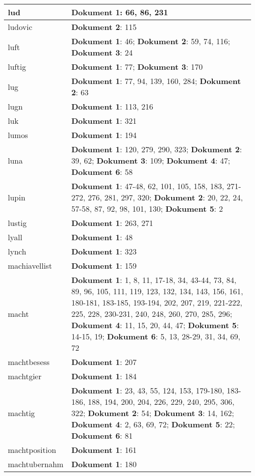 \documentclass[a5paper]{article}
\begin{document}
\begin{longtable}[l]{|l|p{3in}|}
\hline
lud & \textbf{Dokument 1}: 66, 86, 231 \\
\hline
ludovic & \textbf{Dokument 2}: 115 \\
\hline
luft & \textbf{Dokument 1}: 46; \textbf{Dokument 2}: 59, 74, 116; \textbf{Dokument 3}: 24 \\
\hline
luftig & \textbf{Dokument 1}: 77; \textbf{Dokument 3}: 170 \\
\hline
lug & \textbf{Dokument 1}: 77, 94, 139, 160, 284; \textbf{Dokument 2}: 63 \\
\hline
lugn & \textbf{Dokument 1}: 113, 216 \\
\hline
luk & \textbf{Dokument 1}: 321 \\
\hline
lumos & \textbf{Dokument 1}: 194 \\
\hline
luna & \textbf{Dokument 1}: 120, 279, 290, 323; \textbf{Dokument 2}: 39, 62; \textbf{Dokument 3}: 109; \textbf{Dokument 4}: 47; \textbf{Dokument 6}: 58 \\
\hline
lupin & \textbf{Dokument 1}: 47-48, 62, 101, 105, 158, 183, 271-272, 276, 281, 297, 320; \textbf{Dokument 2}: 20, 22, 24, 57-58, 87, 92, 98, 101, 130; \textbf{Dokument 5}: 2 \\
\hline
lustig & \textbf{Dokument 1}: 263, 271 \\
\hline
lyall & \textbf{Dokument 1}: 48 \\
\hline
lynch & \textbf{Dokument 1}: 323 \\
\hline
machiavellist & \textbf{Dokument 1}: 159 \\
\hline
macht & \textbf{Dokument 1}: 1, 8, 11, 17-18, 34, 43-44, 73, 84, 89, 96, 105, 111, 119, 123, 132, 134, 143, 156, 161, 180-181, 183-185, 193-194, 202, 207, 219, 221-222, 225, 228, 230-231, 240, 248, 260, 270, 285, 296; \textbf{Dokument 4}: 11, 15, 20, 44, 47; \textbf{Dokument 5}: 14-15, 19; \textbf{Dokument 6}: 5, 13, 28-29, 31, 34, 69, 72 \\
\hline
machtbesess & \textbf{Dokument 1}: 207 \\
\hline
machtgier & \textbf{Dokument 1}: 184 \\
\hline
machtig & \textbf{Dokument 1}: 23, 43, 55, 124, 153, 179-180, 183-186, 188, 194, 200, 204, 226, 229, 240, 295, 306, 322; \textbf{Dokument 2}: 54; \textbf{Dokument 3}: 14, 162; \textbf{Dokument 4}: 2, 63, 69, 72; \textbf{Dokument 5}: 22; \textbf{Dokument 6}: 81 \\
\hline
machtposition & \textbf{Dokument 1}: 161 \\
\hline
machtubernahm & \textbf{Dokument 1}: 180 \\

\end{longtable}
\end{document}
